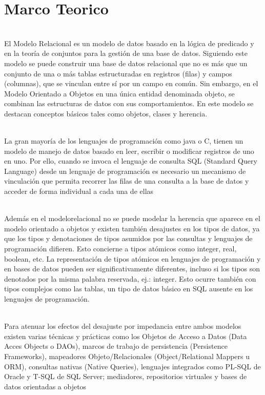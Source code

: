 \section{Marco Teorico } 
\begin{flushleft}
\begin{itemize}
\textbf{}\\
El Modelo Relacional es un modelo de datos basado en la lógica de predicado y en la teoría de conjuntos para  la  gestión  de  una  base  de  datos.  Siguiendo  este  modelo  se  puede  construir  una  base  de  datos relacional  que no  es  más  que  un  conjunto  de  una  o  más  tablas  estructuradas  en  registros  (filas)  y campos  (columnas),  que  se  vinculan  entre  sí  por  un  campo  en  común.  Sin  embargo,  en  el  Modelo Orientado a Objetos en una única entidad denominada objeto, se combinan las estructuras de datos con sus  comportamientos.  En  este  modelo  se  destacan  conceptos  básicos  tales  como  objetos,  clases  y herencia.

\textbf{}\\
La gran mayoría de los lenguajes de programación como java o C, tienen un modelo de manejo de datos basado en leer, escribir o modificar registros de uno en uno. Por ello, cuando se  invoca el lenguaje de consulta   SQL   (Standard   Query   Language)   desde   un   lenguaje   de   programación   es   necesario   un mecanismo de vinculación que permita recorrer las filas de una consulta a la base de datos y acceder de forma individual a cada una de ellas

\textbf{}\\
Además en el modelorelacional no se puede modelar la herencia que aparece en el modelo orientado a objetos  y  existen  también  desajustes  en  los  tipos  de  datos,  ya  que  los  tipos  y  denotaciones  de  tipos asumidos por las consultas y lenguajes de programación difieren. Esto concierne a tipos atómicos como integer,  real,  boolean,  etc.  La  representación  de  tipos  atómicos  en  lenguajes  de  programación  y  en bases de datos pueden ser significativamente diferentes, incluso si los tipos son denotados por la misma palabra  reservada,  ej.: integer.  Esto  ocurre  también  con  tipos  complejos  como  las  tablas,  un  tipo  de datos básico en SQL ausente en los lenguajes de programación. 

\textbf{}\\
Para  atenuar  los  efectos  del  desajuste  por  impedancia  entre  ambos  modelos  existen  varias  técnicas  y prácticas  como  los  Objetos  de  Acceso  a  Datos  (Data  Acces  Objects  o  DAOs),  marcos  de  trabajo  de persistencia  (Persistence  Frameworks),  mapeadores Objeto/Relacionales  (Object/Relational  Mappers  u ORM), consultas nativas (Native Queries), lenguajes integrados como PL-SQL de Oracle y T-SQL de SQL Server; mediadores, repositorios virtuales y bases de datos orientadas a objetos


\end{itemize}
\end{flushleft}
